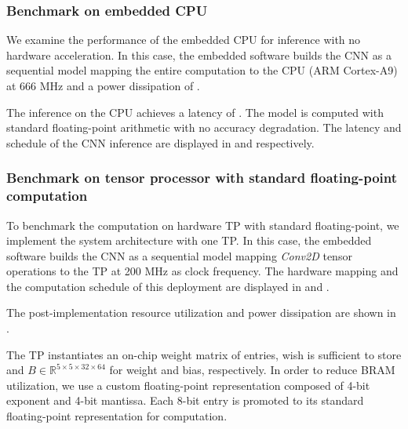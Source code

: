 \subsubsection{Benchmark on embedded CPU}

We examine the performance of the embedded CPU for inference with no hardware acceleration. In this case, the embedded software builds the CNN as a sequential model mapping the entire computation to the CPU (ARM Cortex-A9) at 666 MHz and a power dissipation of .

The inference on the CPU achieves a latency of . The model is computed with standard floating-point arithmetic with no accuracy degradation. The latency and schedule of the CNN inference are displayed in  and  respectively.

\subsubsection{Benchmark on tensor processor with standard floating-point computation}
To benchmark the computation on hardware TP with standard floating-point, we implement the system architecture with one TP. In this case, the embedded software builds the CNN as a sequential model mapping \emph{Conv2D} tensor operations to the TP at 200 MHz as clock frequency. The hardware mapping and the computation schedule of this deployment are displayed in  and .

The post-implementation resource utilization and power dissipation are shown in .

The TP instantiates an on-chip weight matrix of  entries, wish is sufficient to store  and $B\in\mathbb{R}^{5\times 5\times 32\times 64}$ for weight and bias, respectively. In order to reduce BRAM utilization, we use a custom floating-point representation composed of 4-bit exponent and 4-bit mantissa. Each 8-bit entry is promoted to its standard floating-point representation for computation.



